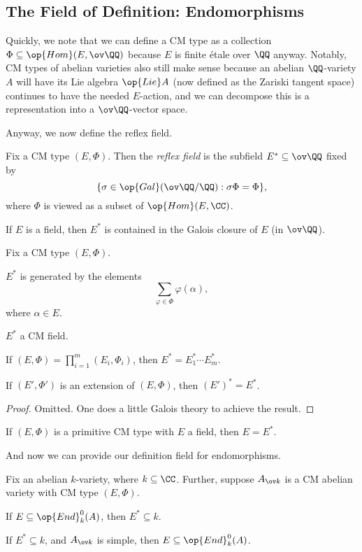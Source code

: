 \documentclass[../notes.tex]{subfiles}
\begin{document}
\subsection{The Field of Definition: Endomorphisms}
Quickly, we note that we can define a CM type as a collection $\Phi\subseteq\op{Hom}(E,\ov\QQ)$ because $E$ is finite \'etale over $\QQ$ anyway. Notably, CM types of abelian varieties also still make sense because an abelian $\QQ$-variety $A$ will have its Lie algebra $\op{Lie}A$ (now defined as the Zariski tangent space) continues to have the needed $E$-action, and we can decompose this is a representation into a $\ov\QQ$-vector space.

Anyway, we now define the reflex field.
\begin{definition}
	Fix a CM type $(E,\Phi)$. Then the \textit{reflex field} is the subfield $E^*\subseteq\ov\QQ$ fixed by
	\[\{\sigma\in\op{Gal}(\ov\QQ/\QQ):\sigma\Phi=\Phi\},\]
	where $\Phi$ is viewed as a subset of $\op{Hom}(E,\CC)$.
\end{definition}
\begin{remark}
	If $E$ is a field, then $E^*$ is contained in the Galois closure of $E$ (in $\ov\QQ$).
\end{remark}
\begin{lemma} \label{lem:how-to-reflex}
	Fix a CM type $(E,\Phi)$.
	\begin{listalph}
		\item $E^*$ is generated by the elements
		\[\sum_{\varphi\in\Phi}\varphi(\alpha),\]
		where $\alpha\in E$.
		\item $E^*$ a CM field.
		\item If $(E,\Phi)=\prod_{i=1}^m(E_i,\Phi_i)$, then $E^*=E_1^*\cdots E_m^*$.
		\item If $(E',\Phi')$ is an extension of $(E,\Phi)$, then $(E')^*=E^*$.
	\end{listalph}
\end{lemma}
\begin{proof}
	Omitted. One does a little Galois theory to achieve the result.
\end{proof}
\begin{example}
	If $(E,\Phi)$ is a primitive CM type with $E$ a field, then $E=E^*$.
\end{example}
And now we can provide our definition field for endomorphisms.
\begin{proposition} \label{prop:endo-over-reflex-field}
	Fix an abelian $k$-variety, where $k\subseteq\CC$. Further, suppose $A_{\ov k}$ is a CM abelian variety with CM type $(E,\Phi)$.
	\begin{listalph}
		\item If $E\subseteq\op{End}^0_k(A)$, then $E^*\subseteq k$.
		\item If $E^*\subseteq k$, and $A_{\ov k}$ is simple, then $E\subseteq\op{End}^0_k(A)$.
	\end{listalph}
\end{proposition}
\end{document}
